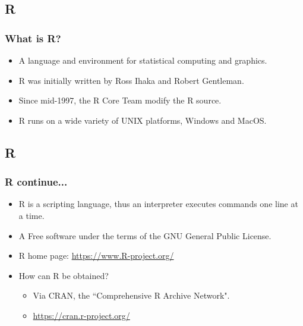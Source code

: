 \documentclass[11pt]{beamer}
\begin{document}
\subsection{R}
\begin{frame}
\frametitle{What is {\sf R}?}
\begin{itemize}
\item A language and environment for statistical computing and graphics.
\vspace{0.2in}
\item {\sf R} was initially written by Ross Ihaka and Robert Gentleman.
\vspace{0.2in}
\item Since mid-1997, the R Core Team modify the {\sf R} source.
\vspace{0.2in}
\item {\sf R} runs on a wide variety of UNIX platforms, Windows and MacOS. 
\end{itemize}
\end{frame}


\subsection{R}
\begin{frame}
\frametitle{{\sf R} continue...}
\begin{itemize}
\item {\sf R} is a scripting language, thus an interpreter executes commands one line at a time.
\vspace{0.15in}
\item A Free software under the terms of the GNU General Public License.
\vspace{0.15in}
\item {\sf R} home page: \url{https://www.R-project.org/}
\vspace{0.2in}
\item How can {\sf R} be obtained? 
\begin{itemize}
\item Via CRAN, the ``Comprehensive R Archive Network".
\item \url{https://cran.r-project.org/}
\end{itemize}
\end{itemize}
\end{frame}
\end{document}
